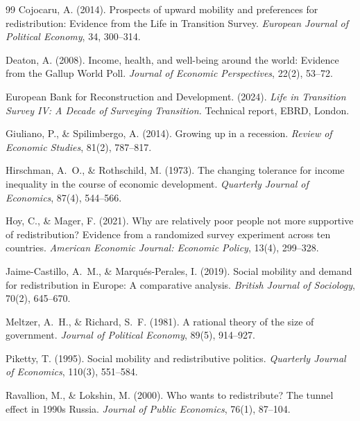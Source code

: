 \documentclass[11pt,a4paper]{article}
\begin{document}
\begin{thebibliography}{99}
Cojocaru, A. (2014).
\newblock Prospects of upward mobility and preferences for redistribution: Evidence from
the Life in Transition Survey.
\newblock \emph{European Journal of Political Economy}, 34, 300--314.

Deaton, A. (2008).
\newblock Income, health, and well-being around the world: Evidence from the Gallup World
Poll.
\newblock \emph{Journal of Economic Perspectives}, 22(2), 53--72.

European Bank for Reconstruction and Development. (2024).
\newblock \emph{Life in Transition Survey IV: A Decade of Surveying Transition.}
\newblock Technical report, EBRD, London.

Giuliano, P., \& Spilimbergo, A. (2014).
\newblock Growing up in a recession.
\newblock \emph{Review of Economic Studies}, 81(2), 787--817.

Hirschman, A.~O., \& Rothschild, M. (1973).
\newblock The changing tolerance for income inequality in the course of economic
development.
\newblock \emph{Quarterly Journal of Economics}, 87(4), 544--566.

Hoy, C., \& Mager, F. (2021).
\newblock Why are relatively poor people not more supportive of redistribution? Evidence
from a randomized survey experiment across ten countries.
\newblock \emph{American Economic Journal: Economic Policy}, 13(4), 299--328.

Jaime-Castillo, A.~M., \& Marqu\'es-Perales, I. (2019).
\newblock Social mobility and demand for redistribution in Europe: A comparative
analysis.
\newblock \emph{British Journal of Sociology}, 70(2), 645--670.

Meltzer, A.~H., \& Richard, S.~F. (1981).
\newblock A rational theory of the size of government.
\newblock \emph{Journal of Political Economy}, 89(5), 914--927.

Piketty, T. (1995).
\newblock Social mobility and redistributive politics.
\newblock \emph{Quarterly Journal of Economics}, 110(3), 551--584.

Ravallion, M., \& Lokshin, M. (2000).
\newblock Who wants to redistribute? The tunnel effect in 1990s Russia.
\newblock \emph{Journal of Public Economics}, 76(1), 87--104.


\end{thebibliography}
\end{document}
